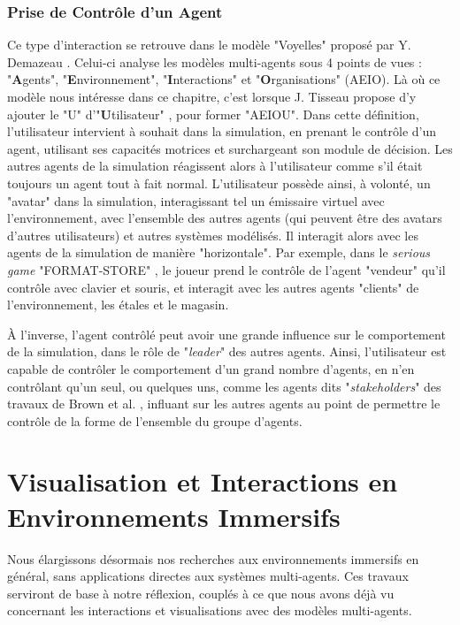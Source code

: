 	\subsubsection{Prise de Contrôle d'un Agent}
		Ce type d'interaction se retrouve dans le modèle "Voyelles" proposé par Y. Demazeau \cite{demazeau_interactions_1995}. Celui-ci analyse les modèles multi-agents sous 4 points de vues : "\textbf{A}gents", "\textbf{E}nvironnement", "\textbf{I}nteractions" et "\textbf{O}rganisations" (AEIO). Là où ce modèle nous intéresse dans ce chapitre, c'est lorsque J. Tisseau propose d'y ajouter le "U" d'"\textbf{U}tilisateur" \cite{tisseau_realite_2001}, pour former "AEIOU". Dans cette définition, l'utilisateur intervient à souhait dans la simulation, en prenant le contrôle d'un agent, utilisant ses capacités motrices et surchargeant son module de décision. Les autres agents de la simulation réagissent alors à l'utilisateur comme s'il était toujours un agent tout à fait normal. 
		L'utilisateur possède ainsi, à volonté, un "avatar" dans la simulation, interagissant tel un émissaire virtuel avec l'environnement, avec l'ensemble des autres agents (qui peuvent être des avatars d'autres utilisateurs) et autres systèmes modélisés. Il interagit alors avec les agents de la simulation de manière "horizontale". Par exemple, dans le \textit{serious game} "FORMAT-STORE" \cite{mathieu_serious_2011}, le joueur prend le contrôle de l'agent "vendeur" qu'il contrôle avec clavier et souris, et interagit avec les autres agents "clients" de l'environnement, les étales et le magasin.
		
		À l'inverse, l'agent contrôlé peut avoir une grande influence sur le comportement de la simulation, dans le rôle de "\textit{leader}" des autres agents. Ainsi, l'utilisateur est capable de contrôler le comportement d'un grand nombre d'agents, en n'en contrôlant qu'un seul, ou quelques uns, comme les agents dits "\textit{stakeholders}" des travaux de Brown et al. \cite{brown_human-swarm_2014}, influant sur les autres agents au point de permettre le contrôle de la forme de l'ensemble du groupe d'agents.
	
	
	\section{Visualisation et Interactions en Environnements Immersifs}	
	
	Nous élargissons désormais nos recherches aux environnements immersifs en général, sans applications directes aux systèmes multi-agents. Ces travaux serviront de base à notre réflexion, couplés à ce que nous avons déjà vu concernant les interactions et visualisations avec des modèles multi-agents.
	

